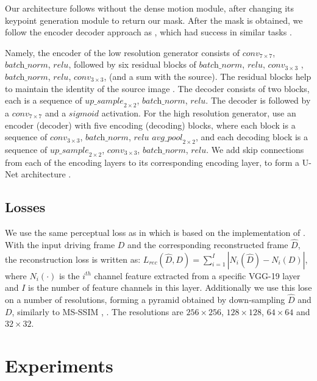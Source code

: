 \documentclass{article}
\begin{document}
Our architecture follows \cite{siarohin2020order} without the dense
motion module, after changing its keypoint generation module to return our
mask. After the mask is obtained, we follow the encoder decoder approach as
\cite{shalev2020image}, which had success in similar tasks
\cite{newell2016stacked}.

Namely, the encoder of the low resolution generator consists of $\textit{conv}_{7
\times 7}$, $\textit{batch\_norm}$, $\textit{relu}$, followed by six
residual blocks of $\textit{batch\_norm}$, $\textit{relu}$,
$\textit{conv}_{3 \times 3}$ ,$\textit{batch\_norm}$, $\textit{relu}$,
$\textit{conv}_{3 \times 3}$, (and a sum with the source).
The residual blocks help to maintain the identity of the source image
\cite{he2015deep}.
The decoder consists of two blocks, each is a sequence of
$\textit{up\_sample}_{2 \times 2 }$, $\textit{batch\_norm}$,
$\textit{relu}$. The decoder is followed by a $\textit{conv}_{7 \times 7}$
and a $\textit{sigmoid}$ activation.
For the high resolution generator, use an encoder (decoder) with five encoding (decoding) blocks,
where each block is a sequence of
$\textit{conv}_{3 \times 3}$, $\textit{batch\_norm}$, $\textit{relu}$
$\textit{avg\_pool}_{2 \times 2}$, and each decoding block is a sequence of
$\textit{up\_sample}_{2 \times 2}$, $\textit{conv}_{3 \times 3}$,
$\textit{batch\_norm}$, $\textit{relu}$.
We add skip connections from each of the encoding layers to its
corresponding encoding layer, to form a U-Net architecture
\cite{ronneberger2015unet}.


\subsection{Losses}
We use the same perceptual loss as in \cite{siarohin2020order} which is
based on the implementation of \cite{wang2018videotovideo}. With the input
driving frame $D$ and the corresponding reconstructed frame $\hat{D}$, the
reconstruction loss is written as: $L_{rec}(\hat{D}, D) =
\sum_{i=1}^{I} |N_i(\hat{D})-N_i(D)|$, where $N_i(\cdot)$ is the $i^{th}$
channel feature extracted from a specific VGG-19 layer \cite{simonyan2015deep}
and $I$ is the number of feature channels in this layer. Additionally we use this lose on
a number of resolutions, forming a pyramid obtained by down-sampling
$\hat{D}$ and $D$, similarly to MS-SSIM \cite{1292216}, \cite{tang2019dual}.
The resolutions are $256
\times 256$, $128 \times 128$, $64 \times 64$ and $32 \times 32$.


\section{Experiments}
\end{document}
